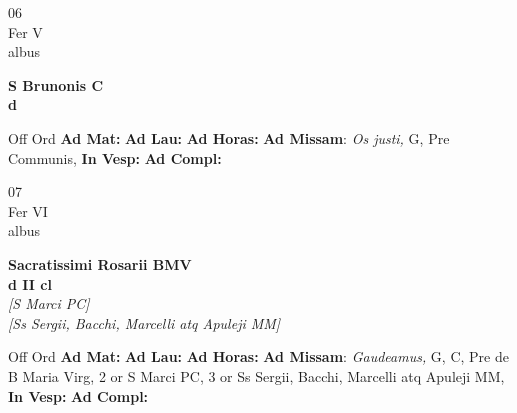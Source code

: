 \documentclass[10pt, openany]{book}
\begin{document}
        \begin{center}
            \begin{minipage}{3.5in}
                \vspace{2em}
                \begin{minipage}{0.5in}
                    {\Huge 06} \\
                    {\normalsize Fer V} \\
                    {\normalsize albus}
                \end{minipage}
                \begin{minipage}{3.0in}
                    \textbf{ \large S Brunonis C \\
                    \textnormal{\normalsize d}} \\ 
                \end{minipage}
                \begin{justify}Off Ord
                    \textbf{Ad Mat: }
                    \textbf{Ad Lau: }
                    \textbf{Ad Horas: }\textbf{Ad Missam}: \textit{Os justi,} G, Pre Communis,  
                    \textbf{In Vesp: }
                    \textbf{Ad Compl: }
                \end{justify}
            \end{minipage}
        \end{center}
    
        \begin{center}
            \begin{minipage}{3.5in}
                \vspace{2em}
                \begin{minipage}{0.5in}
                    {\Huge 07} \\
                    {\normalsize Fer VI} \\
                    {\normalsize albus}
                \end{minipage}
                \begin{minipage}{3.0in}
                    \textbf{ \large Sacratissimi Rosarii BMV \\
                    \textnormal{\normalsize d II cl}} \\ \textit{[S Marci PC]} \\ \textit{[Ss Sergii, Bacchi, Marcelli atq Apuleji MM]} \\ 
                \end{minipage}
                \begin{justify}Off Ord
                    \textbf{Ad Mat: }
                    \textbf{Ad Lau: }
                    \textbf{Ad Horas: }\textbf{Ad Missam}: \textit{Gaudeamus,} G, C, Pre de B Maria Virg, 2 or S Marci PC, 3 or Ss Sergii, Bacchi, Marcelli atq Apuleji MM,  
                    \textbf{In Vesp: }
                    \textbf{Ad Compl: }
                \end{justify}
            \end{minipage}
        \end{center}
    
\end{document}
